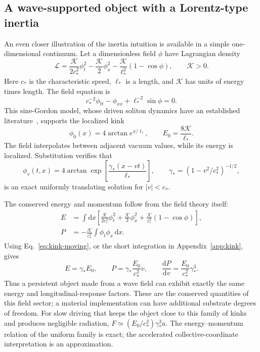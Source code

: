\documentclass[11pt,a4paper]{article}
\numberwithin{equation}{section}
\newcommand{\dd}{\mathrm{d}}
\begin{document}
\subsection{A wave-supported object with a Lorentz-type inertia}
\label{sec:kink}

An even closer illustration of the inertia intuition is available in a simple one-dimensional continuum. Let a dimensionless field $\phi$ have Lagrangian density
\begin{equation}
 \mathcal L=\frac{\mathcal K}{2c_*^2}\phi_t^2
 -\frac{\mathcal K}{2}\phi_x^2
 -\frac{\mathcal K}{\ell_*^2}(1-\cos\phi),
 \qquad \mathcal K>0.
 \label{eq:sg-action}
\end{equation}
Here $c_*$ is the characteristic speed, $\ell_*$ is a length, and $\mathcal K$ has units of energy times length. The field equation is
\begin{equation}
 c_*^{-2}\phi_{tt}-\phi_{xx}+\ell_*^{-2}\sin\phi=0.
 \label{eq:sg}
\end{equation}
This sine-Gordon model, whose driven soliton dynamics have an established literature~\cite{mclaughlin}, supports the localized kink
\begin{equation}
 \phi_0(x)=4\arctan e^{x/\ell_*},\qquad
 E_0=\frac{8\mathcal K}{\ell_*}.
 \label{eq:kink-static}
\end{equation}
The field interpolates between adjacent vacuum values, while its energy is localized. Substitution verifies that
\begin{equation}
 \phi_v(t,x)=4\arctan\exp\!\left[
 \frac{\gamma_*(x-vt)}{\ell_*}\right],
 \qquad \gamma_*=(1-v^2/c_*^2)^{-1/2},
 \label{eq:kink-moving}
\end{equation}
is an exact uniformly translating solution for $|v|<c_*$.

The conserved energy and momentum follow from the field theory itself:
\begin{align}
 E&=\int\!\dd x\left[
 \frac{\mathcal K}{2c_*^2}\phi_t^2+
 \frac{\mathcal K}{2}\phi_x^2+
 \frac{\mathcal K}{\ell_*^2}(1-\cos\phi)\right],\\
 P&=-\frac{\mathcal K}{c_*^2}\int\phi_t\phi_x\,\dd x.
\end{align}
Using Eq.~\eqref{eq:kink-moving}, or the short integration in Appendix~\ref{app:kink}, gives
\begin{equation}
 \boxed{E=\gamma_*E_0,\qquad
 P=\gamma_*\frac{E_0}{c_*^2}v,\qquad
 \frac{\dd P}{\dd v}=\frac{E_0}{c_*^2}\gamma_*^3.}
 \label{eq:kink-inertia}
\end{equation}
Thus a persistent object made from a wave field can exhibit exactly the same energy and longitudinal-response factors. These are the conserved quantities of this field sector; a material implementation can have additional substrate degrees of freedom. For slow driving that keeps the object close to this family of kinks and produces negligible radiation, $F\simeq(E_0/c_*^2)\gamma_*^3a$. The energy--momentum relation of the uniform family is exact; the accelerated collective-coordinate interpretation is an approximation.
\end{document}
